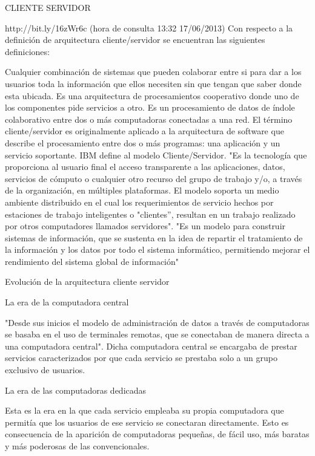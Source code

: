 CLIENTE SERVIDOR

http://bit.ly/16zWr6c (hora de consulta 13:32 17/06/2013)
Con respecto a la definición de arquitectura cliente/servidor se encuentran las siguientes definiciones:

    Cualquier combinación de sistemas que pueden colaborar entre si para dar a los usuarios toda la información que 
     ellos necesiten sin que tengan que saber donde esta ubicada.
    Es una arquitectura de procesamientos cooperativo donde uno de los componentes pide servicios a otro.
    Es un procesamiento de datos de índole colaborativo entre dos o más computadoras conectadas a una red.
    El término cliente/servidor es originalmente aplicado a la arquitectura de software que describe el procesamiento 
     entre dos o más programas: una aplicación y un servicio soportante.
    IBM define al modelo Cliente/Servidor. "Es la tecnología que proporciona al usuario final el acceso transparente a las 
     aplicaciones, datos, servicios de cómputo o cualquier otro recurso del grupo de trabajo y/o, a través de la organización, 
     en múltiples plataformas. El modelo soporta un medio ambiente distribuido en el cual los requerimientos de servicio hechos 
     por estaciones de trabajo inteligentes o "clientes'', resultan en un trabajo realizado por otros computadores llamados 
     servidores".
    "Es un modelo para construir sistemas de información, que se sustenta en la idea de repartir el tratamiento de la información y 
    los datos por todo el sistema informático, permitiendo mejorar el rendimiento del sistema global de información"
    
Evolución de la arquitectura cliente servidor

La era de la computadora central

"Desde sus inicios el modelo de administración de datos a través de computadoras se basaba en el uso de terminales remotas, 
que se conectaban de manera directa a una computadora central". Dicha computadora central se encargaba de prestar servicios 
caracterizados por que cada servicio se prestaba solo a un grupo exclusivo de usuarios.

La era de las computadoras dedicadas

Esta es la era en la que cada servicio empleaba su propia computadora que permitía que los usuarios de ese servicio se 
conectaran directamente. Esto es consecuencia de la aparición de computadoras pequeñas, de fácil uso, más baratas y más 
poderosas de las convencionales.

